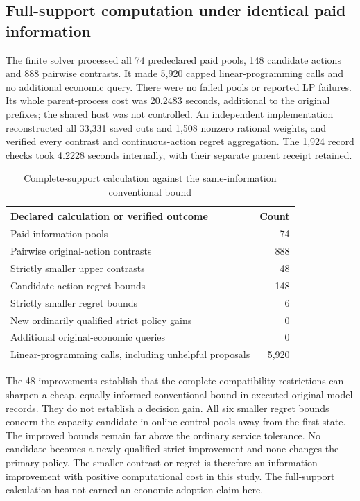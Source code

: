 \subsection{Full-support computation under identical paid information}\label{sec:supportresults126}

The finite solver processed all 74 predeclared paid pools, 148 candidate
actions and 888 pairwise contrasts. It made 5,920 capped linear-programming
calls and no additional economic query. There were no failed pools or
reported LP failures. Its whole parent-process cost was 20.2483 seconds,
additional to the original prefixes; the shared host was not controlled.
An independent implementation reconstructed all 33,331 saved cuts and 1,508
nonzero rational weights, and verified every contrast and continuous-action
regret aggregation. The 1,924 record checks took 4.2228 seconds internally,
with their separate parent receipt retained.

\begin{table}[t]
\caption{Complete-support calculation against the same-information conventional bound}
\label{tab:support126}
\centering
\begin{tabular}{lr}
\toprule
Declared calculation or verified outcome & Count\\
\midrule
Paid information pools &74\\
Pairwise original-action contrasts &888\\
Strictly smaller upper contrasts &48\\
Candidate-action regret bounds &148\\
Strictly smaller regret bounds &6\\
New ordinarily qualified strict policy gains &0\\
Additional original-economic queries &0\\
Linear-programming calls, including unhelpful proposals &5,920\\
\bottomrule
\end{tabular}
\end{table}

The 48 improvements establish that the complete compatibility restrictions
can sharpen a cheap, equally informed conventional bound in executed original
model records. They do not establish a decision gain. All six smaller regret
bounds concern the capacity candidate in online-control pools away from the
first state. The improved bounds remain far above the ordinary service
tolerance. No candidate becomes a newly qualified strict improvement and
none changes the primary policy. The smaller contrast or regret is therefore
an information improvement with positive computational cost in this study.
The full-support calculation has not earned an economic adoption claim here.


